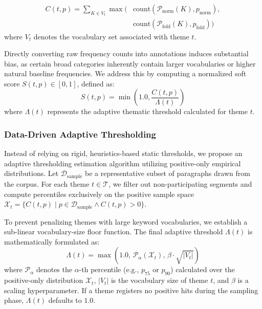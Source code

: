 \documentclass{article}
\theoremstyle{plain}
\theoremstyle{definition}
\theoremstyle{remark}
\begin{document}
\begin{equation}
\begin{split}
C(t, p) = \sum_{K \in V_t} \max \Big( & \text{count}(\mathcal{P}_{\text{norm}}(K), p_{\text{norm}}), \\
& \text{count}(\mathcal{P}_{\text{fold}}(K), p_{\text{fold}}) \Big)
\end{split}
\end{equation}
where $V_t$ denotes the vocabulary set associated with theme $t$.

Directly converting raw frequency counts into annotations induces substantial bias, as certain broad categories inherently contain larger vocabularies or higher natural baseline frequencies. We address this by computing a normalized soft score $S(t, p) \in [0, 1]$, defined as:
\begin{equation}
\label{eq:soft_score}
S(t, p) = \min \left( 1.0, \frac{C(t, p)}{\Lambda(t)} \right)
\end{equation}
where $\Lambda(t)$ represents the adaptive thematic threshold calculated for theme $t$.

\subsubsection{Data-Driven Adaptive Thresholding}
Instead of relying on rigid, heuristics-based static thresholds, we propose an adaptive thresholding estimation algorithm utilizing positive-only empirical distributions. Let $\mathcal{D}_{\text{sample}}$ be a representative subset of paragraphs drawn from the corpus. For each theme $t \in \mathcal{T}$, we filter out non-participating segments and compute percentiles exclusively on the positive sample space $\mathcal{X}_t = \{ C(t, p) \mid p \in \mathcal{D}_{\text{sample}} \land C(t, p) > 0 \}$.

To prevent penalizing themes with large keyword vocabularies, we establish a sub-linear vocabulary-size floor function. The final adaptive threshold $\Lambda(t)$ is mathematically formulated as:
\begin{equation}
\Lambda(t) = \max \left( 1.0, \, \mathcal{P}_{\alpha}(\mathcal{X}_t), \, \beta \cdot \sqrt{|V_t|} \right)
\end{equation}
where $\mathcal{P}_{\alpha}$ denotes the $\alpha$-th percentile (e.g., $p_{75}$ or $p_{90}$) calculated over the positive-only distribution $\mathcal{X}_t$, $|V_t|$ is the vocabulary size of theme $t$, and $\beta$ is a scaling hyperparameter. If a theme registers no positive hits during the sampling phase, $\Lambda(t)$ defaults to $1.0$.
\end{document}
